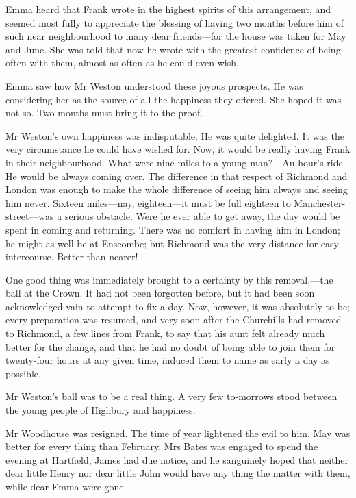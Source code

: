 Emma heard that Frank wrote in the highest spirits of this arrangement, and seemed most fully to appreciate the blessing of having two months before him of such near neighbourhood to many dear friends—for the house was taken for May and June. She was told that now he wrote with the greatest confidence of being often with them, almost as often as he could even wish.

Emma saw how Mr Weston understood these joyous prospects. He was considering her as the source of all the happiness they offered. She hoped it was not so. Two months must bring it to the proof.

Mr Weston's own happiness was indisputable. He was quite delighted. It was the very circumstance he could have wished for. Now, it would be really having Frank in their neighbourhood. What were nine miles to a young man?—An hour's ride. He would be always coming over. The difference in that respect of Richmond and London was enough to make the whole difference of seeing him always and seeing him never. Sixteen miles—nay, eighteen—it must be full eighteen to Manchester-street—was a serious obstacle. Were he ever able to get away, the day would be spent in coming and returning. There was no comfort in having him in London; he might as well be at Enscombe; but Richmond was the very distance for easy intercourse. Better than nearer!

One good thing was immediately brought to a certainty by this removal,—the ball at the Crown. It had not been forgotten before, but it had been soon acknowledged vain to attempt to fix a day. Now, however, it was absolutely to be; every preparation was resumed, and very soon after the Churchills had removed to Richmond, a few lines from Frank, to say that his aunt felt already much better for the change, and that he had no doubt of being able to join them for twenty-four hours at any given time, induced them to name as early a day as possible.

Mr Weston's ball was to be a real thing. A very few to-morrows stood between the young people of Highbury and happiness.

Mr Woodhouse was resigned. The time of year lightened the evil to him. May was better for every thing than February. Mrs Bates was engaged to spend the evening at Hartfield, James had due notice, and he sanguinely hoped that neither dear little Henry nor dear little John would have any thing the matter with them, while dear Emma were gone.

